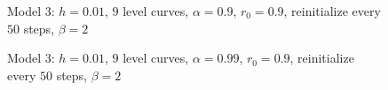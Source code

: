 \begin{figure}
\begin{center}
\end{center}
\vspace{-2.5em}
\caption[Model 3 - Irregular and dense point set $\alpha =0.9$]{Model 3: $h=0.01$, $9$ level curves, $\alpha=0.9$, $r_0=0.9$, reinitialize every $50$ steps, $\beta=2$}
\label{fig:m3-manypoints-a09}
\end{figure}

\begin{figure}
\begin{center}
\end{center}
\vspace{-2.5em}
\caption[Model 3 - Irregular and dense point set $\beta$ parameter]{Model 3: $h=0.01$, $9$ level curves, $\alpha=0.99$, $r_0=0.9$, reinitialize every $50$ steps, $\beta=2$}
\label{fig:m3-many-points-b1-b2}
\end{figure}



